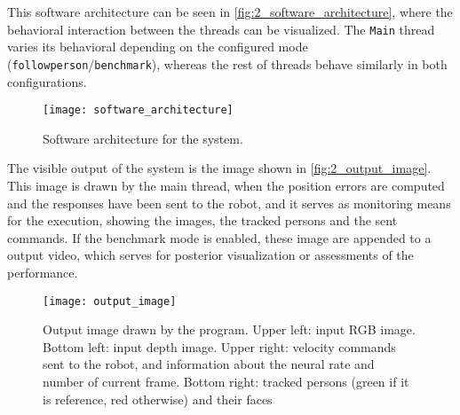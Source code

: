 This software architecture can be seen in \autoref{fig:2_software_architecture}, where the behavioral interaction between the threads can be visualized. The \texttt{Main} thread varies its behavioral depending on the configured mode (\texttt{followperson}/\texttt{benchmark}), whereas the rest of threads  behave similarly in both configurations.

\begin{figure}[h]
	\centering
	\texttt{[image: software\_architecture]}
	\caption{Software architecture for the system.}
	\label{fig:2_software_architecture}
\end{figure}



The visible output of the system is the image shown in \autoref{fig:2_output_image}. This image is drawn by the main thread, when the position errors are computed and the responses have been sent to the robot, and it serves as monitoring means for the execution, showing the images, the tracked persons and the sent commands. If the benchmark mode is enabled, these image are appended to a output video, which serves for posterior visualization or assessments of the performance.

\begin{figure}[h]
	\centering
	\texttt{[image: output\_image]}
	\caption{Output image drawn by the program. Upper left: input RGB image. Bottom left: input depth image. Upper right: velocity commands sent to the robot, and information about the neural rate and number of current frame. Bottom right: tracked persons (green if it is reference, red otherwise) and their faces}
	\label{fig:2_output_image}
\end{figure}




